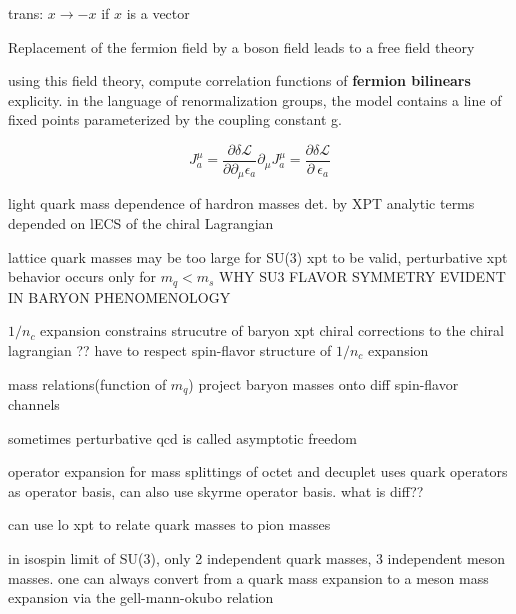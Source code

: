 \documentclass[12pt,tightenlines, raggedbottom, prd, notitlepage]{revtex4-1}
\begin{document}
trans: $x \rightarrow -x$ if $x$ is a vector


Replacement of the fermion field by a boson field leads to a free field theory 

using this field theory, compute correlation functions of \textbf{fermion bilinears} explicity.
in the language of renormalization groups, the model contains a line of fixed points parameterized by 
the coupling constant g. 

$$
  J^\mu_a = \frac{\partial \delta \mathcal{L}}{\partial \partial_\mu \epsilon_a}
  \partial_{\mu} J^{\mu}_a = \frac{\partial \delta \mathcal{L}}{\partial\ \epsilon_a}
$$

light quark mass dependence of hardron masses det. by XPT 
analytic terms depended on lECS of the chiral Lagrangian

lattice quark masses may be too large for SU(3) xpt to be valid, 
perturbative xpt behavior occurs only for $m_q < m_s$
WHY SU3 FLAVOR SYMMETRY EVIDENT IN BARYON PHENOMENOLOGY

$1/n_c$ expansion constrains strucutre of baryon xpt 
chiral corrections to the chiral lagrangian ?? have to respect spin-flavor structure of $1/n_c$ expansion 

mass relations(function of $m_q$)  project baryon masses onto diff spin-flavor channels 

sometimes perturbative qcd is called asymptotic freedom 

operator expansion for mass splittings of octet and decuplet uses quark operators as operator basis, 
can also use skyrme operator basis. what is diff??


can use lo xpt to relate quark masses to pion masses  

in isospin limit of SU(3), only 2 independent quark masses, 3 independent meson masses.
one can always convert from a quark mass expansion to a meson mass expansion via the gell-mann-okubo relation
\end{document}
